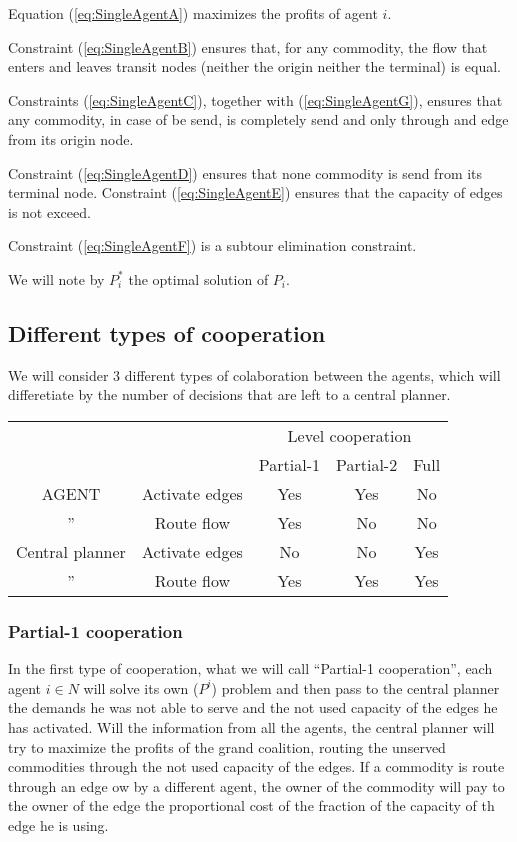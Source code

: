 \documentclass{article}
\begin{document}
Equation (\ref{eq:SingleAgentA}) maximizes the profits of agent $i$. 

Constraint (\ref{eq:SingleAgentB}) ensures that, for any commodity, the flow that enters and leaves transit nodes (neither the origin neither the terminal) is equal.


Constraints (\ref{eq:SingleAgentC}), together with (\ref{eq:SingleAgentG}), ensures that any commodity, in case of be send, is completely send and only through and edge from its origin node.

Constraint (\ref{eq:SingleAgentD}) ensures that none commodity is send from its terminal node. Constraint (\ref{eq:SingleAgentE}) ensures that the capacity of edges is not exceed.

Constraint (\ref{eq:SingleAgentF}) is a subtour elimination constraint.

We will note by $P_i^*$ the optimal solution of $P_i$.

\subsection{Different types of cooperation}

We will consider 3 different types of colaboration between the agents, which will differetiate by 
the number of decisions that are left to a central planner. 


\begin{table}[h!]
    \begin{tabular}{cc|ccc}
        & &      \multicolumn{3}{|c}{Level cooperation} \\\cline{3-5}
        & & Partial-1 & Partial-2 & Full \\ \hline
        AGENT & Activate edges & Yes & Yes & No \\
        '' & Route flow     & Yes & No & No \\\hline
        Central planner & Activate edges & No & No & Yes \\
        '' & Route flow & Yes & Yes & Yes
        \end{tabular}
    \end {table}

\subsubsection*{Partial-1 cooperation}


In the first type of cooperation, what we will call ``Partial-1 cooperation'', each agent $i\in N$ will solve its own ($P^i$) problem and 
then pass to the central planner the demands he was not able to serve and the not used capacity of the 
edges he has activated. Will the information from all the agents, the central planner will try to maximize
the profits of the grand coalition, routing the unserved commodities through the not used capacity
of the edges. If a commodity is route through an edge ow by a different agent, the owner of the commodity
will pay to the owner of the edge the proportional cost of the fraction of the capacity of th edge he is using.
\end{document}
